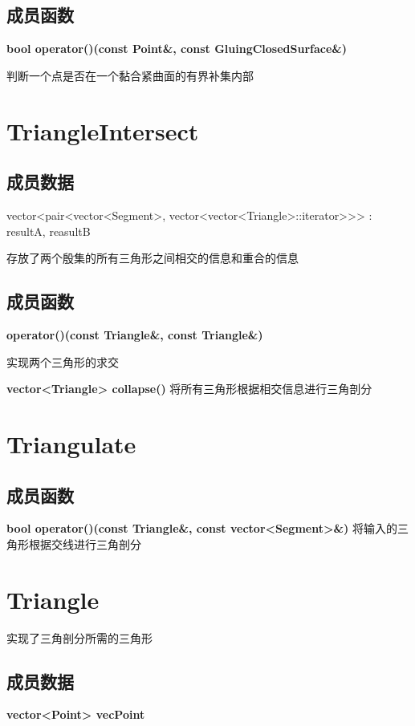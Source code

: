 \documentclass[UTF8]{ctexart}
\begin{document}
	\subsection{成员函数}
	\textbf{bool operator()(const Point\&, const GluingClosedSurface\&)}
	
	判断一个点是否在一个黏合紧曲面的有界补集内部
	
	\section{TriangleIntersect}
	
	\subsection{成员数据}
	vector<pair<vector<Segment>,
	vector<vector<Triangle>::iterator>>> :
	resultA, reasultB
	
	存放了两个殷集的所有三角形之间相交的信息和重合的信息
	
	\subsection{成员函数}
	\textbf{operator()(const Triangle\&, const
		Triangle\&)}
	
	实现两个三角形的求交
	
	\textbf{vector<Triangle> collapse()}
	将所有三角形根据相交信息进行三角剖分
	
	\section{Triangulate}
	
	\subsection{成员函数}
	
	\textbf{bool operator()(const Triangle\&, const vector<Segment>\&)}
	将输入的三角形根据交线进行三角剖分
	
	
		\section{Triangle}
	实现了三角剖分所需的三角形
	
	
	\subsection{成员数据}
	\textbf{vector<Point> vecPoint}
	
\end{document}
